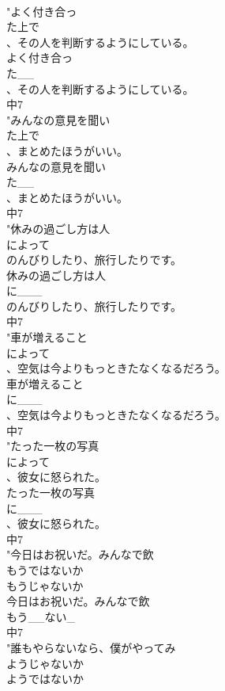 \documentclass[8pt]{extreport}
\begin{document}
\begin{CJK}{UTF8}{min}
\\	"よく付き合っ
\\	た上で
\\	、その人を判断するようにしている。
\\	よく付き合っ
\\	た__
\\	、その人を判断するようにしている。
\\	中7
\\	"みんなの意見を聞い
\\	た上で
\\	、まとめたほうがいい。
\\	みんなの意見を聞い
\\	た__
\\	、まとめたほうがいい。
\\	中7
\\	"休みの過ごし方は人
\\	によって
\\	のんびりしたり、旅行したりです。
\\	休みの過ごし方は人
\\	に___
\\	のんびりしたり、旅行したりです。
\\	中7
\\	"車が増えること
\\	によって
\\	、空気は今よりもっときたなくなるだろう。
\\	車が増えること
\\	に___
\\	、空気は今よりもっときたなくなるだろう。
\\	中7
\\	"たった一枚の写真
\\	によって
\\	、彼女に怒られた。
\\	たった一枚の写真
\\	に___
\\	、彼女に怒られた。
\\	中7
\\	"今日はお祝いだ。みんなで飲
\\	もうではないか
\\	もうじゃないか
\\	今日はお祝いだ。みんなで飲
\\	もう__ない_
\\	中7
\\	"誰もやらないなら、僕がやってみ
\\	ようじゃないか
\\	ようではないか

\end{CJK}
\end{document}
